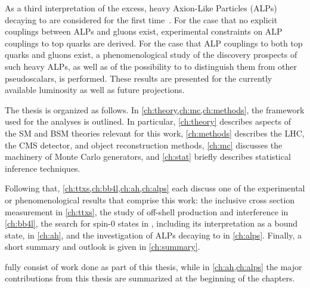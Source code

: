 As a third interpretation of the excess, heavy Axion-Like Particles (ALPs) decaying to \ttbar are considered for the first time~\cite{Jeppe:2024sxt}. 
For the case that no explicit couplings between ALPs and gluons exist, experimental constraints on ALP couplings to top quarks are derived.
For the case that ALP couplings to both top quarks and gluons exist, a phenomenological study of the discovery prospects of such heavy ALPs, as well as of the possibility to to distinguish them from other pseudoscalars, is performed. These results are presented for the currently available luminosity as well as future projections.


\medskip

The thesis is organized as follows. In \cref{ch:theory,ch:mc,ch:methods}, the framework used for the analyses is outlined. In particular, \cref{ch:theory} describes aspects of the SM and BSM theories relevant for this work, \cref{ch:methods} describes the LHC, the CMS detector, and object reconstruction methods, \cref{ch:mc} discusses the machinery of Monte Carlo generators, and \cref{ch:stat} briefly describes statistical inference techniques. 

Following that, \cref{ch:ttxs,ch:bb4l,ch:ah,ch:alps} each discuss one of the experimental or phenomenological results that comprise this work: the inclusive \ttbar cross section measurement in \cref{ch:ttxs}, the study of off-shell \ttbar production and \tttW interference in \cref{ch:bb4l}, the search for spin-0 states in \ttbar, including its interpretation as a \ttbar bound state, in \cref{ch:ah}, and the investigation of ALPs decaying to \ttbar in \cref{ch:alps}. Finally, a short summary and outlook is given in \cref{ch:summary}.

 fully consist of work done as part of this thesis, while in \cref{ch:ah,ch:alps} the major contributions from this thesis are summarized at the beginning of the chapters. 




